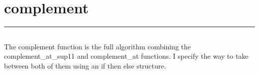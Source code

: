 \documentclass[letterpaper,10pt,english]{sphinxmanual}
\begin{document}
\subsection{}
\label{\detokenize{complement_at_sup11v3.1:source-code}}
\begin{sphinxVerbatim}[commandchars=\\\{\}]
   
 \PYG{p}{[}\PYG{p}{]}\PYG{p}{[}\PYG{p}{]}
\end{sphinxVerbatim}

\newpage
\section{complement}
\label{\detokenize{complementv3.1:complement}}\label{\detokenize{complementv3.1::doc}}
\begin{sphinxVerbatim}[commandchars=\\\{\}]
 
\end{sphinxVerbatim}


\bigskip\hrule\bigskip



\subsection{}
\label{\detokenize{complementv3.1:algorithm}}
\sphinxAtStartPar
The complement function is the full algorithm combining the complement\_at\_sup11 and complement\_at functions.
I specify the way to take between both of them using an if then else structure.
\end{document}
